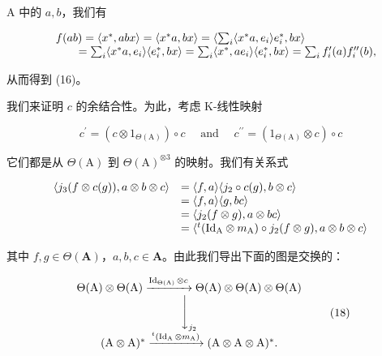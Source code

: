 A 中的 \(a, b\)，我们有

\[
\begin{array}{r l} & {f (a b) = \langle x ^ {*}, a b x \rangle = \langle x ^ {*} a, b x \rangle = \left\langle \sum_ {i} \langle x ^ {*} a, e _ {i} \rangle e _ {i} ^ {*}, b x \right\rangle} \\ & {\qquad = \sum_ {i} \langle x ^ {*} a, e _ {i} \rangle \langle e _ {i} ^ {*}, b x \rangle = \sum_ {i} \langle x ^ {*}, a e _ {i} \rangle \langle e _ {i} ^ {*}, b x \rangle = \sum_ {i} f _ {i} ^ {\prime} (a) f _ {i} ^ {\prime \prime} (b),} \end{array}
\]

从而得到 (16)。

我们来证明 \(c\) 的余结合性。为此，考虑 K-线性映射

\[
c ^ {\prime} = \left(c \otimes 1 _ {\Theta (\mathrm{A})}\right) \circ c \quad \text { and } \quad c ^ {\prime \prime} = \left(1 _ {\Theta (\mathrm{A})} \otimes c\right) \circ c
\]

它们都是从 \(\Theta (\mathrm{A})\) 到 \(\Theta (\mathrm{A})^{\otimes 3}\) 的映射。我们有关系式

\[
\begin{array}{r l} \langle j _ {3} (f \otimes c (g)), a \otimes b \otimes c \rangle & = \langle f, a \rangle \langle j _ {2} \circ c (g), b \otimes c \rangle \\ & = \langle f, a \rangle \langle g, b c \rangle \\ & = \langle j _ {2} (f \otimes g), a \otimes b c \rangle \\ & = \langle^ {t} (\mathrm{Id} _ {\mathrm{A}} \otimes m _ {\mathrm{A}}) \circ j _ {2} (f \otimes g), a \otimes b \otimes c \rangle \end{array}
\]

其中 \(f, g \in \Theta(\mathbf{A})\)，\(a, b, c \in \mathbf{A}\)。由此我们导出下面的图是交换的：

\[
\begin{array}{c} \Theta (\mathrm{A}) \otimes \Theta (\mathrm{A}) \xrightarrow {\operatorname{Id} _ {\Theta (\mathrm{A})} \otimes c} \Theta (\mathrm{A}) \otimes \Theta (\mathrm{A}) \otimes \Theta (\mathrm{A}) \\ \Biggl \downarrow_ {j _ {2}} \\ (\mathrm{A} \otimes \mathrm{A}) ^ {*} \xrightarrow {^ t (\operatorname{Id} _ {\mathrm{A}} \otimes m _ {\mathrm{A}})} (\mathrm{A} \otimes \mathrm{A} \otimes \mathrm{A}) ^ {*}. \end{array}\tag{18}
\]

